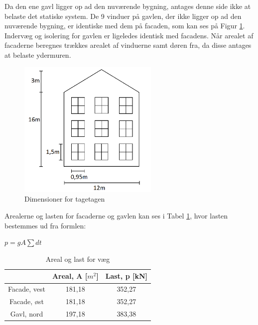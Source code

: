 Da den ene gavl ligger op ad den nuværende bygning, antages denne side ikke at belaste det statiske system. 
\newline \indent{     }  De 9 vinduer på gavlen, der ikke ligger op ad den nuværende bygning, er identiske med dem på facaden, som kan ses på Figur \ref{fig:gavl}. Indervæg og isolering for gavlen er ligeledes identisk med facadens.
\newline \indent{     }  Når arealet af facaderne beregnes trækkes arealet af vinduerne samt døren fra, da disse antages at belaste ydermuren.

\begin{figure}[H]
	\centering
	\includegraphics[width=0.6\textwidth]{billeder/facadevestellerost.png}
	\caption{Dimensioner for tagetagen}
	\label{fig:gavl}
\end{figure}

Arealerne og lasten for facaderne og gavlen kan ses i Tabel \ref{tab:arealoglast}, hvor lasten bestemmes ud fra formlen:
\begin{center}
	$p = g A \sum dt$
\end{center}

\begin{table}
	\begin{center}
		\begin{tabular}{|c|c|c|}
			\hline
			& Areal, A [$m^2$]   & Last, p [kN]    \\ \hline
			Facade, vest & 181,18 & 352,27 \\ \hline
			Facade, øst  & 181,18 & 352,27 \\ \hline
			Gavl, nord   & 197,18 & 383,38 \\ \hline
		\end{tabular}
		\caption{Areal og last for væg}
		\label{tab:arealoglast}
	\end{center}
\end{table}


